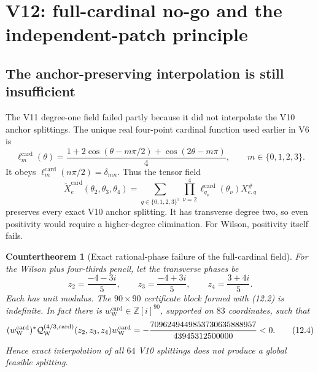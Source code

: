\documentclass[11pt,oneside]{article}
\newtheorem{countertheorem}[theorem]{Countertheorem}
\theoremstyle{definition}
\theoremstyle{remark}
\begin{document}
\section{V12: full-cardinal no-go and the independent-patch principle}
\label{sec:newv12-cardinal-patches}

\subsection{The anchor-preserving interpolation is still insufficient}

The V11 degree-one field failed partly because it did not interpolate
the V10 anchor splittings.  The unique real four-point cardinal
function used earlier in V6 is
\[
 \ell_m^{\mathrm{card}}(\theta)
 =
 \frac{1+2\cos(\theta-m\pi/2)
 +\cos(2\theta-m\pi)}4,\qquad m\in\{0,1,2,3\}.            \tag{12.1}
\]
It obeys
\(\ell_m^{\mathrm{card}}(n\pi/2)=\delta_{mn}\).
Thus the tensor field
\[
 \widetilde X_e^{\mathrm{card}}(\theta_2,\theta_3,\theta_4)
 =
 \sum_{q\in\{0,1,2,3\}^3}
 \prod_{\nu=2}^4
 \ell_{q_\nu}^{\mathrm{card}}(\theta_\nu)X_{e,q}^{\#}     \tag{12.2}
\]
preserves every exact V10 anchor splitting.  It has transverse degree
two, so even positivity would require a higher-degree elimination.
For Wilson, positivity itself fails.

\begin{countertheorem}[Exact rational-phase failure of the full-cardinal field]
\label{ctr:newv12-cardinal}
For the Wilson plus four-thirds pencil, let the transverse phases be
\[
 z_2=\frac{-4-3i}{5},\qquad
 z_3=\frac{-4+3i}{5},\qquad
 z_4=\frac{3+4i}{5}.                                     \tag{12.3}
\]
Each has unit modulus.  The \(90\times90\) certificate block formed
with (12.2) is indefinite.  In fact there is
\(w_{\mathrm W}^{\mathrm{card}}\in\mathbb Z[i]^{90}\),
supported on \(83\) coordinates, such that
\[
 (w_{\mathrm W}^{\mathrm{card}})^*
 {\cal Q}_{\mathrm W}^{(4/3,\mathrm{card})}(z_2,z_3,z_4)
 w_{\mathrm W}^{\mathrm{card}}
 =
 -\frac{7096249449853730635888957}{43945312500000}<0.     \tag{12.4}
\]
Hence exact interpolation of all \(64\) V10 splittings does not
produce a global feasible splitting.
\end{countertheorem}
\end{document}

